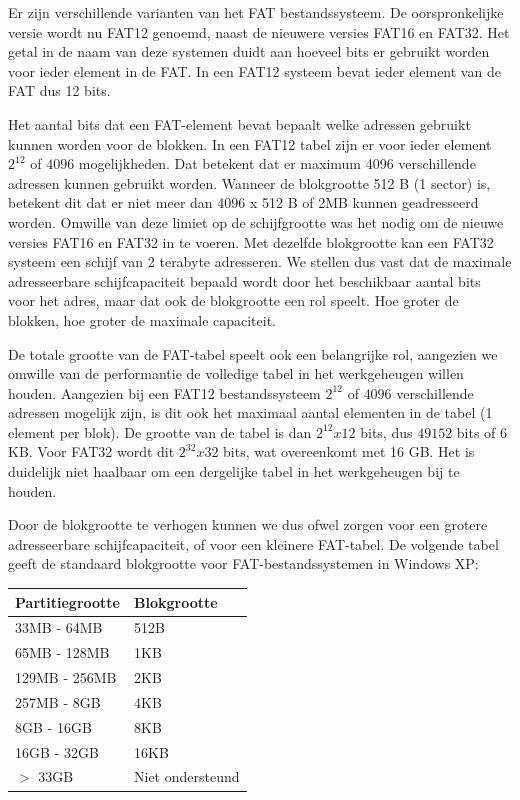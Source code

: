 Er zijn verschillende varianten van het FAT bestandssysteem. De
oorspronkelijke versie wordt nu FAT12 genoemd, naast de nieuwere
versies FAT16 en FAT32. Het getal in de naam van deze systemen duidt
aan hoeveel bits er gebruikt worden voor ieder element in de FAT. In
een FAT12 systeem bevat ieder element van de FAT dus 12 bits.

Het aantal bits dat een FAT-element bevat bepaalt welke adressen
gebruikt kunnen worden voor de blokken. In een FAT12 tabel zijn er
voor ieder element $2^{12}$ of $4096$
mogelijkheden. Dat betekent dat er maximum 4096 verschillende adressen
kunnen gebruikt worden. Wanneer de blokgrootte 512 B (1 sector) is,
betekent dit dat er niet meer dan 4096 x 512 B of 2MB kunnen
geadresseerd worden. Omwille van deze limiet op de schijfgrootte was
het nodig om de nieuwe versies FAT16 en FAT32 in te voeren. Met
dezelfde blokgrootte kan een FAT32 systeem een schijf van 2 terabyte
adresseren. We stellen dus vast dat de maximale adresseerbare
schijfcapaciteit bepaald wordt door het beschikbaar aantal bits voor
het adres, maar dat ook de blokgrootte een rol speelt. Hoe groter de
blokken, hoe groter de maximale capaciteit.

De totale grootte van de FAT-tabel speelt ook een belangrijke
rol, aangezien we omwille van de performantie de volledige tabel in
het werkgeheugen willen houden. Aangezien bij een FAT12
bestandssysteem $2^{12}$ of $4096$ verschillende
adressen mogelijk zijn, is dit ook het maximaal aantal elementen in de
tabel (1 element per blok). De grootte van de tabel is dan
$2^{12}x12$ bits, dus $49152$ bits of 6 KB. Voor
FAT32 wordt dit $2^{32}x32$ bits, wat
overeenkomt met 16 GB. Het is duidelijk niet haalbaar om een
dergelijke tabel in het werkgeheugen bij te houden.

Door de blokgrootte te verhogen kunnen we dus ofwel zorgen voor
een grotere adresseerbare schijfcapaciteit, of voor een kleinere
FAT-tabel. De volgende tabel geeft de standaard blokgrootte voor
FAT-bestandssystemen in Windows XP:

\begin{center}
\begin{tabular}{|l|l|}
\hline
Partitiegrootte  & Blokgrootte \\
\hline
33MB - 64MB      & 512B \\
65MB - 128MB     & 1KB \\
129MB - 256MB    & 2KB \\
257MB - 8GB      & 4KB \\
8GB - 16GB       & 8KB \\
16GB - 32GB      & 16KB \\
$>$ 33GB         & Niet ondersteund\\
\hline
\end{tabular}
\end{center}

